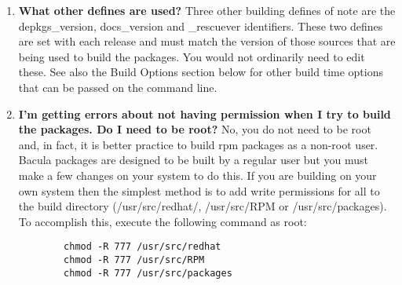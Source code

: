 \begin{enumerate}
\begin{verbatim}
\end{verbatim}
\normalsize

to  

\footnotesize
\begin{verbatim}
        %define mysql 1
        OR
        %define mysql4 1
        OR
        %define mysql5 1
        
\end{verbatim}
\normalsize

in the spec file directly or pass it to rpmbuild on the command line:  

\footnotesize
\begin{verbatim}
        rpmbuild -ba --define "build_rh7 1" --define "build_mysql 1" bacula.spec
        rpmbuild -ba --define "build_rh7 1" --define "build_mysql4 1" bacula.spec
        rpmbuild -ba --define "build_rh7 1" --define "build_mysql5 1" bacula.spec
        
\end{verbatim}
\normalsize

\item 
   \label{faq3}
   {\bf What other defines are used?}
   Three other building defines of note are the depkgs\_version, docs\_version and
   \_rescuever identifiers. These  two defines are set with each release and must 
   match the version of those sources that are being used to build the packages. 
   You would not ordinarily need to edit these.  See also the Build Options section 
   below for other build time options that can be passed on the command line.
\item 
   \label{faq4}
   {\bf I'm getting errors about not having permission when I try  to build the
   packages. Do I need to be root?}
   No, you do not need to be root and, in fact, it is better practice to
   build rpm packages as a non-root user.  Bacula packages are designed to
   be built by a regular user but you must make a few changes on your
   system to do this.  If you are building on your own system then the
   simplest method is to add write permissions for all to the build
   directory (/usr/src/redhat/, /usr/src/RPM or /usr/src/packages).  
   To accomplish this, execute the following command as root:

\footnotesize
\begin{verbatim}
        chmod -R 777 /usr/src/redhat
        chmod -R 777 /usr/src/RPM
        chmod -R 777 /usr/src/packages
        
\end{verbatim}
\normalsize


\end{enumerate}
